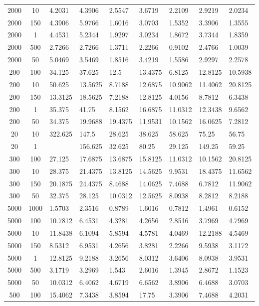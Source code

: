 \begin{table*}
\begin{center}
\begin{tabular}{cc|lllllll}
2000&10&  4.2031& 4.3906&  2.5547& 3.6719&  2.2109&2.9219&  2.0234\\
2000&150&  4.3906& 5.9766&  1.6016& 3.0703&  1.5352&3.3906&  1.3555\\
2000&1&  4.4531& 5.2344&  1.9297& 3.0234&  1.8672&3.7344&  1.8359\\
2000&500&  2.7266& 2.7266&  1.3711& 2.2266&  0.9102&2.4766&  1.0039\\
2000&50&  5.0469& 3.5469&  1.8516& 3.4219&  1.5586&2.9297&  2.2578\\
200&100&  34.125& 37.625&  12.5& 13.4375&  6.8125&12.8125&  10.5938\\
200&10&  50.625& 13.5625&  8.7188& 12.6875&  10.9062&11.4062&  20.8125\\
200&150&  13.3125& 18.5625&  7.2188& 12.8125&  4.0156&8.7812&  6.3438\\
200&1&  35.375& 41.75&  8.1562& 16.6875&  11.0312&12.3438&  9.6562\\
200&50&  34.375& 19.9688&  19.4375& 11.9531&  10.1562&16.0625&  7.2812\\
20&10&  322.625& 147.5&  28.625& 38.625&  58.625&75.25&  56.75\\
20&1&& 156.625&  32.625& 80.25&  29.125&149.25&  59.25\\
300&100&  27.125& 17.6875&  13.6875& 15.8125&  11.0312&10.1562&  20.8125\\
300&10&  28.375& 21.4375&  13.8125& 14.5625&  9.9531&18.4375&  11.6562\\
300&150&  20.1875& 24.4375&  8.4688& 14.0625&  7.4688&6.7812&  11.9062\\
300&50&  32.375& 28.125&  10.0312& 12.5625&  8.0938&8.2812&  8.2188\\
5000&1000&  1.5703& 2.3516&  0.8789& 1.6016&  0.7812&1.4961&  0.6152\\
5000&100&  10.7812& 6.4531&  4.3281& 4.2656&  2.8516&3.7969&  4.7969\\
5000&10&  11.8438& 6.1094&  5.8594& 4.5781&  4.0469&12.2188&  4.5469\\
5000&150&  8.5312& 6.9531&  4.2656& 3.8281&  2.2266&9.5938&  3.1172\\
5000&1&  12.8125& 9.2188&  3.2656& 8.0312&  3.6406&8.0938&  3.9531\\
5000&500&  3.1719& 3.2969&  1.543& 2.6016&  1.3945&2.8672&  1.1523\\
5000&50&  10.0312& 6.4062&  4.6719& 6.6562&  3.8906&6.4688&  3.0703\\
500&100&  15.4062& 7.3438&  3.8594& 17.75&  3.3906&7.4688&  4.2031\\

\end{tabular}
\end{center}
\end{table*}
